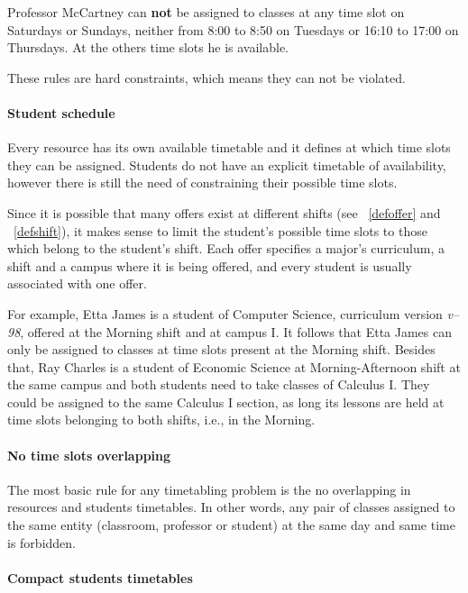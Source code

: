 Professor McCartney can \textbf{not} be assigned to classes at any time slot on Saturdays or Sundays, neither from 8:00 to 8:50 on Tuesdays or 16:10 to 17:00 on Thursdays. At the others time slots he is available.

These rules are hard constraints, which means they can not be violated.


\paragraph{Student schedule}
\label{constrstudentsched}

Every resource has its own available timetable and it defines at which time slots they can be assigned. Students do not have an explicit timetable of availability, however there is still the need of constraining their possible time slots.

Since it is possible that many offers exist at different shifts (see ~\ref{defoffer} and ~\ref{defshift}), it makes sense to limit the student's possible time slots to those which belong to the student's shift. Each offer specifies a major's curriculum, a shift and a campus where it is being offered, and every student is usually associated with one offer.

For example, Etta James is a student of Computer Science, curriculum version \textit{v--98}, offered at the Morning shift and at campus I. It follows that Etta James can only be assigned to classes at time slots present at the Morning shift. Besides that, Ray Charles is a student of Economic Science at Morning-Afternoon shift at the same campus and both students need to take classes of Calculus I. They could be assigned to the same Calculus I section, as long its lessons are held at time slots belonging to both shifts, i.e., in the Morning.


\paragraph{No time slots overlapping}
\label{constroverlap}

The most basic rule for any timetabling problem is the no overlapping in resources and students timetables. In other words, any pair of classes assigned to the same entity (classroom, professor or student) at the same day and same time is forbidden.


\paragraph{Compact students timetables}
\label{constrmingapstudent}

